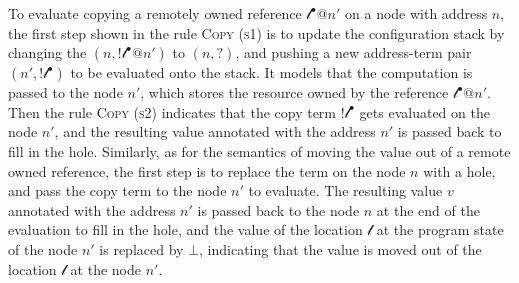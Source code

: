 To evaluate copying a remotely owned reference $\mathscr{l}^\bullet@n'$ on a node with address $n$, the first step shown in the rule \textsc{Copy (s1)} is to update the configuration stack by changing the $(n, !\mathscr{l}^\bullet@n')$ to $(n, ?)$, and pushing a new address-term pair $(n', !\mathscr{l}^\bullet)$ to be evaluated onto the stack. It models that the computation is passed to the node $n'$, which stores the resource owned by the reference $\mathscr{l}^\bullet@n'$. Then the rule \textsc{Copy (s2)} indicates that the copy term $!\mathscr{l}^\bullet$ gets evaluated on the node $n'$, and the resulting value annotated with the address $n'$ is passed back to fill in the hole. Similarly, as for the semantics of moving the value out of a remote owned reference, the first step is to replace the term on the node $n$ with a hole, and pass the copy term to the node $n'$ to evaluate. The resulting value $v$ annotated with the address $n'$ is passed back to the node $n$ at the end of the evaluation to fill in the hole, and the value of the location $\mathscr{l}$ at the program state of the node $n'$ is replaced by $\bot$, indicating that the value is moved out of the location $\mathscr{l}$ at the node $n'$.

